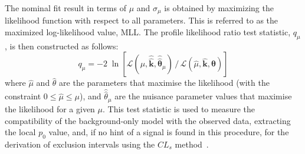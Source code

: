 The nominal fit result in terms of $\mu$ and $\sigma_{\mu}$ is obtained by
maximizing the likelihood function with respect to all parameters.  This is
referred to as the maximized log-likelihood value, MLL. The profile likelihood
ratio test statistic, $q_\mu$, is then constructed as follows:
\begin{equation}
  q_\mu = - 2\; \ln \left[ \mathcal{L} (\mu, \hat{\hat{\mathbf{k}}},
    \hat{\hat{\bm\theta}}_{\mu})\, / \, \mathcal{L} (\hat{\mu},
    \hat{\mathbf{k}}, \hat{\bm\theta}) \right]
\end{equation}
where $\hat{\mu}$ and $\hat{\theta}$ are the parameters that maximise the
likelihood (with the constraint $0 \leq \hat{\mu} \leq \mu$), and
$\hat{\hat{\theta}}_\mu$ are the nuisance parameter values that maximise the
likelihood for a given $\mu$. This test statistic is used to measure the
compatibility of the background-only model with the observed data, extracting
the local $p_0$ value, and, if no hint of a signal is found in this procedure,
for the derivation of exclusion intervals using the $CL_s$
method~\cite{Cowan:2010js,Read:2002hq}.





